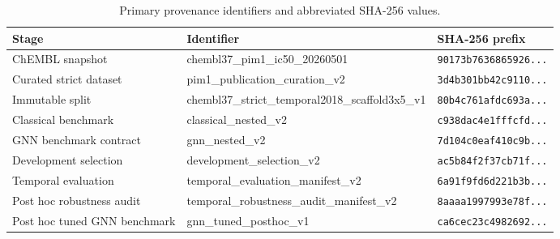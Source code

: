 \begin{table}[H]
\centering
\caption{Primary provenance identifiers and abbreviated SHA-256 values.}
\label{tab:artifact-hashes}
\small
\begin{tabular}{L{0.28\textwidth}L{0.37\textwidth}L{0.25\textwidth}}
\toprule
\textbf{Stage} & \textbf{Identifier} & \textbf{SHA-256 prefix} \\
\midrule
ChEMBL snapshot & chembl37\_\allowbreak{}pim1\_\allowbreak{}ic50\_\allowbreak{}20260501 & \texttt{90173b7636865926...} \\
Curated strict dataset & pim1\_\allowbreak{}publication\_\allowbreak{}curation\_\allowbreak{}v2 & \texttt{3d4b301bb42c9110...} \\
Immutable split & chembl37\_\allowbreak{}strict\_\allowbreak{}temporal2018\_\allowbreak{}scaffold3x5\_\allowbreak{}v1 & \texttt{80b4c761afdc693a...} \\
Classical benchmark & classical\_\allowbreak{}nested\_\allowbreak{}v2 & \texttt{c938dac4e1fffcfd...} \\
GNN benchmark contract & gnn\_\allowbreak{}nested\_\allowbreak{}v2 & \texttt{7d104c0eaf410c9b...} \\
Development selection & development\_\allowbreak{}selection\_\allowbreak{}v2 & \texttt{ac5b84f2f37cb71f...} \\
Temporal evaluation & temporal\_\allowbreak{}evaluation\_\allowbreak{}manifest\_\allowbreak{}v2 & \texttt{6a91f9fd6d221b3b...} \\
Post hoc robustness audit & temporal\_\allowbreak{}robustness\_\allowbreak{}audit\_\allowbreak{}manifest\_\allowbreak{}v2 & \texttt{8aaaa1997993e78f...} \\
Post hoc tuned GNN benchmark & gnn\_\allowbreak{}tuned\_\allowbreak{}posthoc\_\allowbreak{}v1 & \texttt{ca6cec23c4982692...} \\
\bottomrule
\end{tabular}
\end{table}
